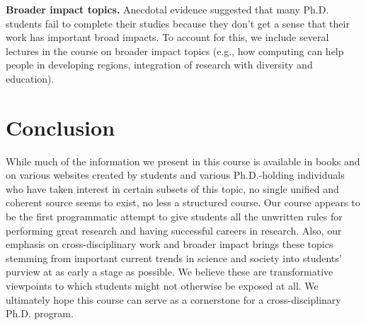 \vspace*{0.1in}
\noindent
{\bf Broader impact topics.}  Anecdotal evidence suggested that many
Ph.D. students fail to complete their studies because they don't get a
sense that their work has important broad impacts.  To account for this,
we include several lectures in the course on broader impact topics
(e.g., how computing can help people in developing regions, integration
of research with diversity and education).  
\section{Conclusion}\label{sec:conclusion}

While much of the information we present in this course is available in
books and on various websites created by students and various
Ph.D.-holding individuals who have taken interest in certain subsets of
this topic, no single unified and coherent source seems to exist, no
less a structured course.  Our course appears to be the first
programmatic attempt to give students all the unwritten rules for
performing great research and having successful careers in research.
Also, our emphasis on cross-disciplinary work and broader impact brings
these topics stemming from important current trends in science and
society into students' purview at as early a stage as possible.  We
believe these are transformative viewpoints to which students might not
otherwise be exposed at all.  We ultimately hope this course can
serve as a cornerstone for a cross-disciplinary Ph.D. program.

